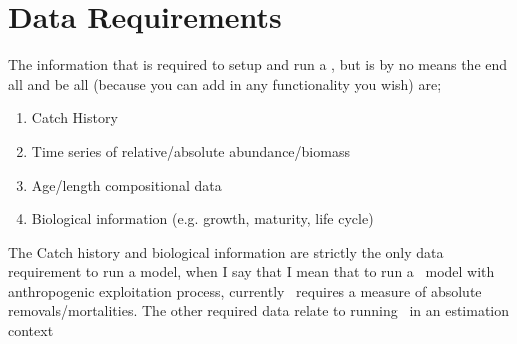 \section{Data Requirements}\label{sec:data_requirements}

The information that is required to setup and run a \CNAME, but is by no means the end all and be all (because you can add in any functionality you wish) are;
\begin{enumerate}
	\item Catch History
	\item Time series of relative/absolute abundance/biomass
	\item Age/length compositional data
	\item Biological information (e.g. growth, maturity, life cycle)
\end{enumerate}

The Catch history and biological information are strictly the only data requirement to run a model, when I say that I mean that to run a \CNAME\ model with anthropogenic exploitation process, currently \CNAME\ requires a measure of absolute removals/mortalities. The other required data relate to running \CNAME\ in an estimation context



